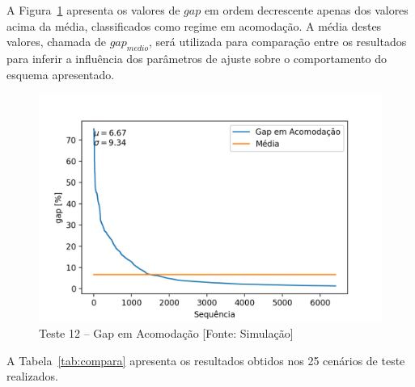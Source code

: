 A Figura~\ref{fig:Teste_12.trans} apresenta os valores de $gap$ em ordem decrescente apenas dos valores acima da m{\'e}dia, classificados como regime em acomoda{\c c}{\~a}o. A m{\'e}dia destes valores, chamada de $gap_{medio}$, ser{\'a} utilizada para compara{\c c}{\~a}o entre os resultados para inferir a influ{\^e}ncia dos par{\^a}metros de ajuste sobre o comportamento do esquema apresentado.


\begin{figure}[!h]
	\centering
	\includegraphics[width=1.0\linewidth]{figuras/trans}
	\caption[Teste 12 \--- Gap em Acomoda{\c c}{\~a}o]{Teste 12 \--- Gap em Acomoda{\c c}{\~a}o [Fonte: Simula{\c c}{\~a}o]}
	\label{fig:Teste_12.trans}
\end{figure}

A Tabela~\ref{tab:compara} apresenta os resultados obtidos nos 25 cen{\'a}rios de teste realizados.


